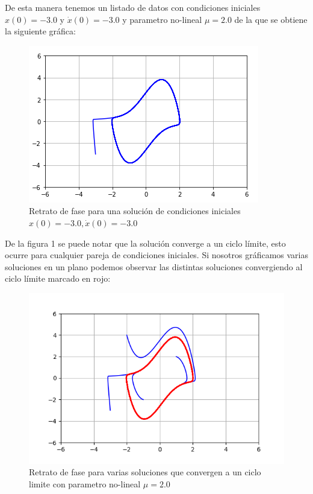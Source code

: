 \documentclass{article}
\begin{document}
De esta manera tenemos un listado de datos con condiciones iniciales $x(0)=-3.0$ y $\dot{x}(0)=-3.0$ y parametro no-lineal $\mu=2.0$ de la que se obtiene la siguiente gráfica:
\begin{figure}[ht!]
\centering
\includegraphics[width=0.5\linewidth]{act8a.png}
\caption{Retrato de fase para una solución de condiciones iniciales$x(0)=-3.0,\dot{x}(0)=-3.0$}
\end{figure}

\newpage

De la figura 1 se puede notar que la solución converge a un ciclo límite, esto ocurre para cualquier pareja de condiciones iniciales. Si nosotros gráficamos varias soluciones en un plano podemos observar las distintas soluciones convergiendo al ciclo límite marcado en rojo:

\begin{figure}[ht!]
\centering
\includegraphics[width=0.5\linewidth]{fig2.png}
\caption{Retrato de fase para varias soluciones que convergen a un ciclo limite con parametro no-lineal $\mu=2.0$}
\end{figure}
\end{document}
